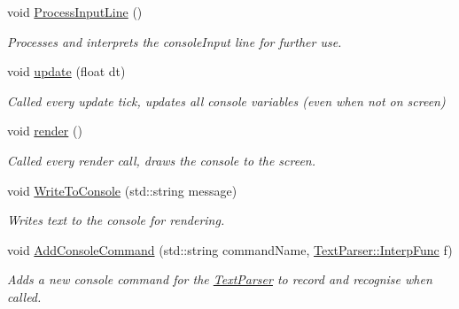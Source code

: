\begin{DoxyCompactItemize}
\mbox{\label{class_debug_helper_a1a58402827749bbe28318387936de404}} 
void \mbox{\hyperlink{class_debug_helper_a1a58402827749bbe28318387936de404}{Process\+Input\+Line}} ()
\begin{DoxyCompactList}\small\item\em Processes and interprets the console\+Input line for further use. \end{DoxyCompactList}\item 
\mbox{\label{class_debug_helper_a8ef4429ee0c1146b563c53d4a4b44ca8}} 
void \mbox{\hyperlink{class_debug_helper_a8ef4429ee0c1146b563c53d4a4b44ca8}{update}} (float dt)
\begin{DoxyCompactList}\small\item\em Called every update tick, updates all console variables (even when not on screen) \end{DoxyCompactList}\item 
\mbox{\label{class_debug_helper_a2af378fe6006f6024d5486d8090732aa}} 
void \mbox{\hyperlink{class_debug_helper_a2af378fe6006f6024d5486d8090732aa}{render}} ()
\begin{DoxyCompactList}\small\item\em Called every render call, draws the console to the screen. \end{DoxyCompactList}\item 
\mbox{\label{class_debug_helper_a44cff1d53586f120fcab4b8e3e84e438}} 
void \mbox{\hyperlink{class_debug_helper_a44cff1d53586f120fcab4b8e3e84e438}{Write\+To\+Console}} (std\+::string message)
\begin{DoxyCompactList}\small\item\em Writes text to the console for rendering. \end{DoxyCompactList}\item 
\mbox{\label{class_debug_helper_a0395140c6b19bba0c8e10809b22a136f}} 
void \mbox{\hyperlink{class_debug_helper_a0395140c6b19bba0c8e10809b22a136f}{Add\+Console\+Command}} (std\+::string command\+Name, \mbox{\hyperlink{class_text_parser_a9cd16418d2032d830f4ed2c2624e703d}{Text\+Parser\+::\+Interp\+Func}} f)
\begin{DoxyCompactList}\small\item\em Adds a new console command for the \mbox{\hyperlink{class_text_parser}{Text\+Parser}} to record and recognise when called. \end{DoxyCompactList}\end{DoxyCompactItemize}
